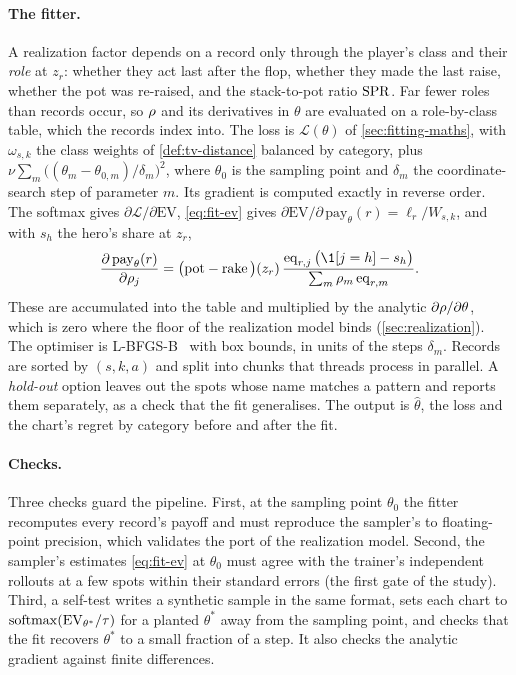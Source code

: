 \paragraph{The fitter.}
A realization factor depends on a record only through the player's class and their \emph{role} at $z_r$: whether
they act last after the flop, whether they made the last raise, whether the pot was re-raised, and the stack-to-pot
ratio $\mathrm{SPR}$. Far fewer roles than records occur, so $\rho$ and its derivatives in $\theta$ are
evaluated on a role-by-class table, which the records index into. The loss is $\mathcal L(\theta)$ of
\cref{sec:fitting-maths}, with $\omega_{s,k}$ the class weights of \cref{def:tv-distance} balanced by category,
plus $\nu \sum_m \big((\theta_m - \theta_{0,m})/\delta_m\big)^2$, where $\theta_0$ is the sampling point and $\delta_m$
the coordinate-search step of parameter $m$. Its gradient is computed exactly in reverse order. The softmax gives
$\partial\mathcal L/\partial \mathrm{EV}$, \eqref{eq:fit-ev} gives $\partial \mathrm{EV}/\partial\,\mathrm{pay}_\theta(r)
= \ell_r/W_{s,k}$, and with $s_h$ the hero's share at $z_r$,
\[
  \frac{\partial\, \mathrm{pay}_\theta(r)}{\partial \real_j} = \big(\pot - \rake\big)(z_r)\,
  \frac{\eq_{r,j}\,\big(\1[j = h] - s_h\big)}{\sum_{m} \real_m\, \eq_{r,m}} .
\]
These are accumulated into the table and multiplied by the analytic $\partial\rho/\partial\theta$, which is zero where
the floor of the realization model binds (\cref{sec:realization}). The optimiser is L-BFGS-B~\cite{byrd1995} with box
bounds, in units of the steps $\delta_m$. Records are sorted by $(s,k,a)$ and split into chunks that threads process in
parallel. A \emph{hold-out} option leaves out the spots whose name matches a pattern and reports them separately, as a
check that the fit generalises. The output is $\hat\theta$, the loss and the chart's regret by category before and
after the fit.

\paragraph{Checks.}
Three checks guard the pipeline. First, at the sampling point $\theta_0$ the fitter recomputes every record's payoff
and must reproduce the sampler's to floating-point precision, which validates the port of the realization model.
Second, the sampler's estimates \eqref{eq:fit-ev} at $\theta_0$ must agree with the trainer's independent rollouts at a
few spots within their standard errors (the first gate of the study). Third, a self-test writes a synthetic sample in
the same format, sets each chart to $\operatorname{softmax}(\mathrm{EV}_{\theta^*}/\tau)$ for a planted $\theta^*$ away from the
sampling point, and checks that the fit recovers $\theta^*$ to a small fraction of a step. It also checks the analytic
gradient against finite differences.

